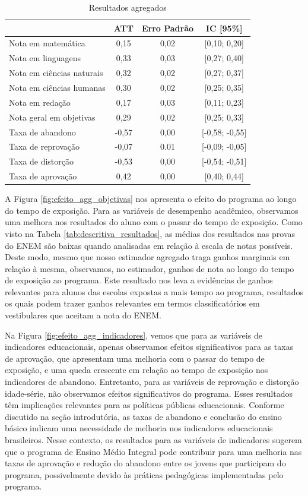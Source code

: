 \begin{table}[b]
\centering
\caption{Resultados agregados}
\label{tab:d_resultados}
\begin{tabular}{lccc}
\hline
                          & ATT & Erro Padrão & IC [95\%]  
 \\ \hline
Nota em matemática& 0,15&0,02& [0,10; 0,20]\\
Nota em linguagens        &  0,33 & 0,03& [0,27; 0,40]\\
Nota em ciências naturais & 0,32 & 0,02& [0,27; 0,37]\\
Nota em ciências humanas  & 0,30 & 0,02 & [0,25; 0,35]\\
Nota em redação& 0,17& 0,03& [0,11; 0,23]\\
Nota geral em objetivas & 0,29& 0,02& [0,25; 0,33]\\
Taxa de abandono& -0,57& 0,00& [-0,58; -0,55]\\
Taxa de reprovação        & -0,07& 0.01& [-0,09; -0,05]\\
Taxa de distorção& -0,53& 0,00& [-0,54; -0,51]\\
Taxa de aprovação         & 0,42& 0,00& [0,40; 0,44]\\ \hline 
\end{tabular}
\end{table}

A Figura \ref{fig:efeito_agg_objetivas} nos apresenta o efeito do programa ao longo do tempo de exposição. Para as variáveis de desempenho acadêmico, observamos uma melhora nos resultados do aluno com o passar do tempo de exposição. Como visto na Tabela \ref{tab:descritiva_resultados}, as médias dos resultados nas provas do ENEM são baixas quando analisadas em relação à escala de notas possíveis. Deste modo, mesmo que nosso estimador agregado traga ganhos marginais em relação à mesma, observamos, no estimador, ganhos de nota ao longo do tempo de exposição ao programa. Este resultado nos leva a evidências de ganhos relevantes para alunos das escolas expostas a mais tempo ao programa, resultados os quais podem trazer ganhos relevantes em termos classificatórios em vestibulares que aceitam a nota do ENEM.

Na Figura \ref{fig:efeito_agg_indicadores}, vemos que para as variáveis de indicadores educacionais, apenas observamos efeitos significativos para as taxas de aprovação, que apresentam uma melhoria com o passar do tempo de exposição, e uma queda crescente em relação ao tempo de exposição nos indicadores de abandono. Entretanto, para as variáveis de reprovação e distorção idade-série, não observamos efeitos significativos do programa. Esses resultados têm implicações relevantes para as políticas públicas educacionais. Conforme discutido na seção introdutória, as taxas de abandono e conclusão do ensino básico indicam uma necessidade de melhoria nos indicadores educacionais brasileiros. Nesse contexto, os resultados para as variáveis de indicadores sugerem que o programa de Ensino Médio Integral pode contribuir para uma melhoria nas taxas de aprovação e redução do abandono entre os jovens que participam do programa, possivelmente devido às práticas pedagógicas implementadas pelo programa.

